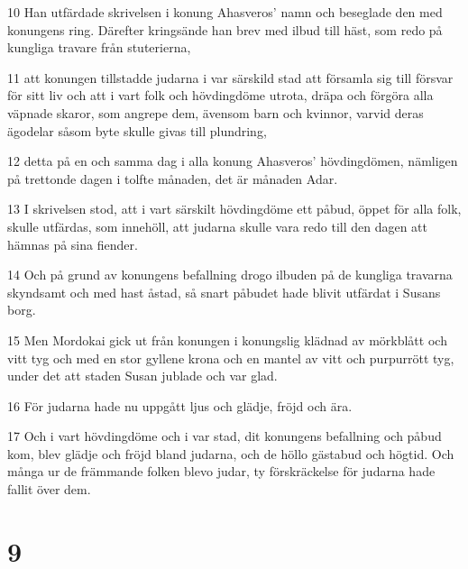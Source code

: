 \par 10 Han utfärdade skrivelsen i konung Ahasveros' namn och beseglade den med konungens ring. Därefter kringsände han brev med ilbud till häst, som redo på kungliga travare från stuterierna,
\par 11 att konungen tillstadde judarna i var särskild stad att församla sig till försvar för sitt liv och att i vart folk och hövdingdöme utrota, dräpa och förgöra alla väpnade skaror, som angrepe dem, ävensom barn och kvinnor, varvid deras ägodelar såsom byte skulle givas till plundring,
\par 12 detta på en och samma dag i alla konung Ahasveros' hövdingdömen, nämligen på trettonde dagen i tolfte månaden, det är månaden Adar.
\par 13 I skrivelsen stod, att i vart särskilt hövdingdöme ett påbud, öppet för alla folk, skulle utfärdas, som innehöll, att judarna skulle vara redo till den dagen att hämnas på sina fiender.
\par 14 Och på grund av konungens befallning drogo ilbuden på de kungliga travarna skyndsamt och med hast åstad, så snart påbudet hade blivit utfärdat i Susans borg.
\par 15 Men Mordokai gick ut från konungen i konungslig klädnad av mörkblått och vitt tyg och med en stor gyllene krona och en mantel av vitt och purpurrött tyg, under det att staden Susan jublade och var glad.
\par 16 För judarna hade nu uppgått ljus och glädje, fröjd och ära.
\par 17 Och i vart hövdingdöme och i var stad, dit konungens befallning och påbud kom, blev glädje och fröjd bland judarna, och de höllo gästabud och högtid. Och många ur de främmande folken blevo judar, ty förskräckelse för judarna hade fallit över dem.

\chapter{9}

